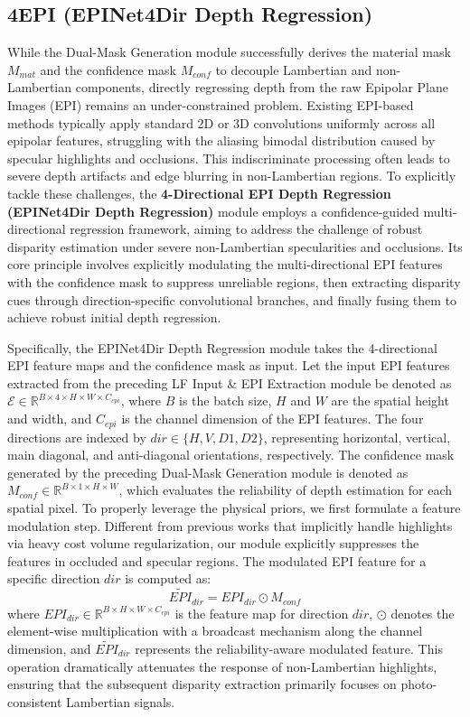 \subsection{4EPI (EPINet4Dir Depth Regression)}

While the Dual-Mask Generation module successfully derives the material mask $M_{mat}$ and the confidence mask $M_{conf}$ to decouple Lambertian and non-Lambertian components, directly regressing depth from the raw Epipolar Plane Images (EPI) remains an under-constrained problem. Existing EPI-based methods typically apply standard 2D or 3D convolutions uniformly across all epipolar features, struggling with the aliasing bimodal distribution caused by specular highlights and occlusions. This indiscriminate processing often leads to severe depth artifacts and edge blurring in non-Lambertian regions. To explicitly tackle these challenges, the \textbf{4-Directional EPI Depth Regression (EPINet4Dir Depth Regression)} module employs a confidence-guided multi-directional regression framework, aiming to address the challenge of robust disparity estimation under severe non-Lambertian specularities and occlusions. Its core principle involves explicitly modulating the multi-directional EPI features with the confidence mask to suppress unreliable regions, then extracting disparity cues through direction-specific convolutional branches, and finally fusing them to achieve robust initial depth regression.

Specifically, the EPINet4Dir Depth Regression module takes the 4-directional EPI feature maps and the confidence mask as input. Let the input EPI features extracted from the preceding LF Input \& EPI Extraction module be denoted as $\mathcal{E} \in \mathbb{R}^{B \times 4 \times H \times W \times C_{epi}}$, where $B$ is the batch size, $H$ and $W$ are the spatial height and width, and $C_{epi}$ is the channel dimension of the EPI features. The four directions are indexed by $dir \in \{H, V, D1, D2\}$, representing horizontal, vertical, main diagonal, and anti-diagonal orientations, respectively. The confidence mask generated by the preceding Dual-Mask Generation module is denoted as $M_{conf} \in \mathbb{R}^{B \times 1 \times H \times W}$, which evaluates the reliability of depth estimation for each spatial pixel. To properly leverage the physical priors, we first formulate a feature modulation step. Different from previous works that implicitly handle highlights via heavy cost volume regularization, our module explicitly suppresses the features in occluded and specular regions. The modulated EPI feature for a specific direction $dir$ is computed as:
\begin{equation}
\label{eq:eq41}
\widetilde{EPI}_{dir} = EPI_{dir} \odot M_{conf}
\end{equation}
where $EPI_{dir} \in \mathbb{R}^{B \times H \times W \times C_{epi}}$ is the feature map for direction $dir$, $\odot$ denotes the element-wise multiplication with a broadcast mechanism along the channel dimension, and $\widetilde{EPI}_{dir}$ represents the reliability-aware modulated feature. This operation dramatically attenuates the response of non-Lambertian highlights, ensuring that the subsequent disparity extraction primarily focuses on photo-consistent Lambertian signals.

